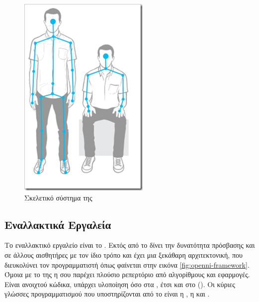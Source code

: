 \begin{figure}[H]
    \centering
    \includegraphics[height=.35\textheight]{kinect/fig/microsoft-skeleton.png}
    \caption{Σκελετικό σύστημα της \protect\footnotemark}
    \label{fig:microsoft-sdk-skeleton}
\end{figure}

\subsection{Εναλλακτικά Εργαλεία}

Το εναλλακτικό εργαλείο είναι το . Εκτός από το  δίνει την δυνατότητα πρόσβασης και σε άλλους αισθητήρες με τον ίδιο τρόπο και έχει μια ξεκάθαρη αρχιτεκτονική, που διευκολύνει τον προγραμματιστή όπως φαίνεται στην εικόνα \ref{fig:openni-framework}. Όμοια με το  της  η  σου παρέχει πλούσιο ρεπερτόριο από αλγορίθμους και εφαρμογές. Είναι ανοιχτού κώδικα, υπάρχει υλοποίηση όσο στα , έτσι και στο  (). Οι κύριες γλώσσες προγραμματισμού  που υποστηρίζονται από το  είναι η , η  και .

